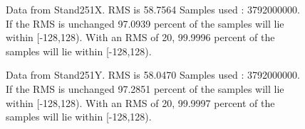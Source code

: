 \begin{figure}[ht] 				 				 				\caption{Data from Stand251X. RMS is 58.7564 Samples used : 3792000000. If the RMS is unchanged 97.0939 percent of the samples will lie within [-128,128).  				 With an RMS of 20, 99.9996 percent of the samples will lie within [-128,128).} 				\end{figure} 

\begin{figure}[ht] 				 				 				\caption{Data from Stand251Y. RMS is 58.0470 Samples used : 3792000000. If the RMS is unchanged 97.2851 percent of the samples will lie within [-128,128).  				 With an RMS of 20, 99.9997 percent of the samples will lie within [-128,128).} 				\end{figure} 

